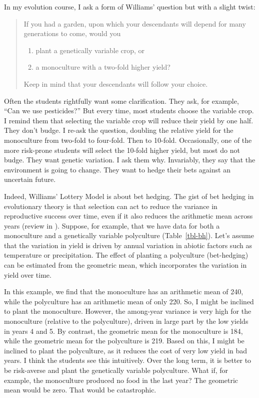 \documentclass[
  letterpaper,
]{book}
\providecommand{\tightlist}{%
  \setlength{\itemsep}{0pt}\setlength{\parskip}{0pt}}\usepackage{longtable,booktabs,array}
\begin{document}
In my evolution course, I ask a form of Williams' question but with a
slight twist:

\begin{quote}
If you had a garden, upon which your descendants will depend for many
generations to come, would you

\begin{enumerate}
\def\labelenumi{\arabic{enumi}.}
\tightlist
\item
  plant a genetically variable crop, or
\item
  a monoculture with a two-fold higher yield?
\end{enumerate}

Keep in mind that your descendants will follow your choice.
\end{quote}

Often the students rightfully want some clarification. They ask, for
example, ``Can we use pesticides?'' But every time, most students choose
the variable crop. I remind them that selecting the variable crop will
reduce their yield by one half. They don't budge. I re-ask the question,
doubling the relative yield for the monoculture from two-fold to
four-fold. Then to 10-fold. Occasionally, one of the more risk-prone
students will select the 10-fold higher yield, but most do not budge.
They want genetic variation. I ask them why. Invariably, they say that
the environment is going to change. They want to hedge their bets
against an uncertain future.

Indeed, Williams' Lottery Model is about bet hedging. The gist of bet
hedging in evolutionary theory is that selection can act to reduce the
variance in reproductive success over time, even if it also reduces the
arithmetic mean across years (review in
). Suppose, for
example, that we have data for both a monoculture and a genetically
variable polyculture (Table~\ref{tbl-bh}). Let's assume that the
variation in yield is driven by annual variation in abiotic factors such
as temperature or precipitation. The effect of planting a polyculture
(bet-hedging) can be estimated from the geometric mean, which
incorporates the variation in yield over time.

In this example, we find that the monoculture has an arithmetic mean of
240, while the polyculture has an arithmetic mean of only 220. So, I
might be inclined to plant the monoculture. However, the among-year
variance is very high for the monoculture (relative to the polyculture),
driven in large part by the low yields in years 4 and 5. By contrast,
the geometric mean for the monoculture is 184, while the geometric mean
for the polyculture is 219. Based on this, I might be inclined to plant
the polyculture, as it reduces the cost of very low yield in bad years.
I think the students see this intuitively. Over the long term, it is
better to be risk-averse and plant the genetically variable polyculture.
What if, for example, the monoculture produced no food in the last year?
The geometric mean would be zero. That would be catastrophic.
\end{document}
